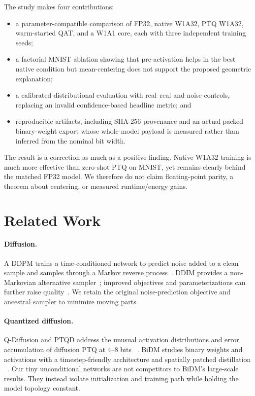 \documentclass[conference]{IEEEtran}
\begin{document}
The study makes four contributions:
\begin{itemize}
  \item a parameter-compatible comparison of FP32, native W1A32, PTQ W1A32,
  warm-started QAT, and a W1A1 core, each with three independent training seeds;
  \item a factorial MNIST ablation showing that pre-activation helps in the best
  native condition but mean-centering does not support the proposed geometric
  explanation;
  \item a calibrated distributional evaluation with real--real and noise controls,
  replacing an invalid confidence-based headline metric; and
  \item reproducible artifacts, including SHA-256 provenance and an actual packed
  binary-weight export whose whole-model payload is measured rather than inferred
  from the nominal bit width.
\end{itemize}

The result is a correction as much as a positive finding. Native W1A32 training
is much more effective than zero-shot PTQ on MNIST, yet remains clearly behind the
matched FP32 model. We therefore do not claim floating-point parity, a theorem
about centering, or measured runtime/energy gains.

\section{Related Work}

\paragraph{Diffusion.}
A DDPM trains a time-conditioned network to predict noise added to a clean sample
and samples through a Markov reverse process~\cite{ho2020ddpm}. DDIM provides a
non-Markovian alternative sampler~\cite{song2020ddim}; improved objectives and
parameterizations can further raise quality~\cite{nichol2021improved}. We retain
the original noise-prediction objective and ancestral sampler to minimize moving
parts.

\paragraph{Quantized diffusion.}
Q-Diffusion and PTQD address the unusual activation distributions and error
accumulation of diffusion PTQ at 4--8 bits
~\cite{li2023qdiffusion,he2023ptqd}. BiDM studies binary weights and activations
with a timestep-friendly architecture and spatially patched distillation
~\cite{bidm2024}. Our tiny unconditional networks are not competitors to BiDM's
large-scale results. They instead isolate initialization and training path while
holding the model topology constant.
\end{document}
